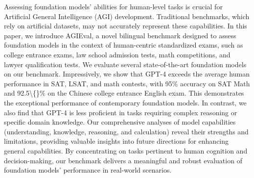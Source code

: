 Assessing foundation models' abilities for human-level tasks is crucial for Artificial General Intelligence (AGI) development. Traditional benchmarks, which rely on artificial datasets, may not accurately represent these capabilities. In this paper, we introduce AGIEval, a novel bilingual benchmark designed to assess foundation models in the context of human-centric standardized exams, such as college entrance exams, law school admission tests, math competitions, and lawyer qualification tests.  We evaluate several state-of-the-art foundation models on our benchmark.  Impressively, we show that GPT-4 exceeds the average human performance in SAT, LSAT, and math contests, with 95\% accuracy on SAT Math and 92.5\textbackslash\{\}\% on the Chinese college entrance English exam. This demonstrates the exceptional performance of contemporary foundation models.  In contrast, we also find that GPT-4 is less proficient in tasks requiring complex reasoning or specific domain knowledge. Our comprehensive analyses of model capabilities (understanding, knowledge, reasoning, and calculation) reveal their strengths and limitations, providing valuable insights into future directions for enhancing general capabilities. By concentrating on tasks pertinent to human cognition and decision-making, our benchmark delivers a meaningful and robust evaluation of foundation models' performance in real-world scenarios.